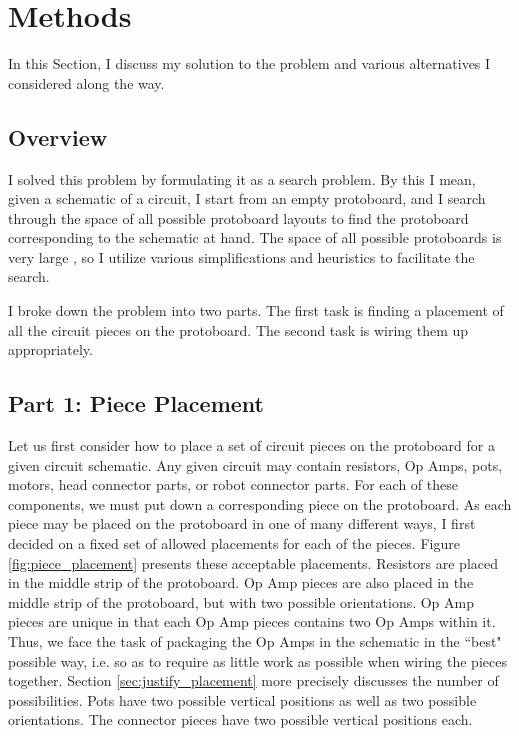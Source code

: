 
\chapter{Methods}
\label{ch:methods}

In this Section, I discuss my solution to the problem and various alternatives I
considered along the way.

\section{Overview}

I solved this problem by formulating it as a search problem. By this I mean,
given a schematic of a circuit, I start from an empty protoboard, and I search
through the space of all possible protoboard layouts to find the protoboard
corresponding to the schematic at hand. The space of all possible protoboards is
very large \q, so I utilize various simplifications
and heuristics to facilitate the search.

I broke down the problem into two parts. The first task is finding a placement
of all the circuit pieces on the protoboard. The second task is wiring them up
appropriately.

\section{Part 1: Piece Placement}
\label{sec:placement}

Let us first consider how to place a set of circuit pieces on the protoboard for
a given circuit schematic. Any given circuit may contain resistors, Op Amps,
pots, motors, head connector parts, or robot connector parts. For each of these
components, we must put down a corresponding piece on the protoboard. As each
piece may be placed on the protoboard in one of many different ways, I first
decided on a fixed set of allowed placements for each of the pieces. Figure
\ref{fig:piece_placement} presents these acceptable placements.
Resistors are placed in the middle strip of the protoboard. Op Amp pieces are
also placed in the middle strip of the protoboard, but with two possible
orientations. Op Amp pieces are unique in that each Op Amp pieces contains two
Op Amps within it. Thus, we face the task of packaging the Op Amps in the
schematic in the ``best" possible way, i.e. so as to require as little work as
possible when wiring the pieces together. Section \ref{sec:justify_placement}
more precisely discusses the number of possibilities. Pots have two possible
vertical positions as well as two possible orientations.
The connector pieces have two possible vertical positions each.

